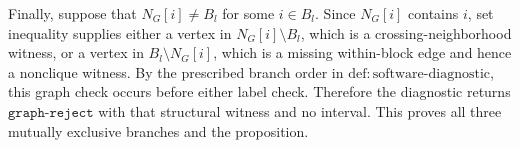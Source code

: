 Finally, suppose that \(N_G[i]\ne B_l\) for some \(i\in B_l\).  Since
\(N_G[i]\) contains \(i\), set inequality supplies either a vertex in
\(N_G[i]\setminus B_l\), which is a crossing-neighborhood witness, or a vertex in
\(B_l\setminus N_G[i]\), which is a missing within-block edge and hence a nonclique witness.  By the prescribed branch order in
\(\mathrm{def{:}software\text{-}diagnostic}\), this graph check occurs before either label check.  Therefore the diagnostic returns
\(\texttt{graph-reject}\) with that structural witness and no interval.  This proves all three mutually exclusive branches and the proposition.
